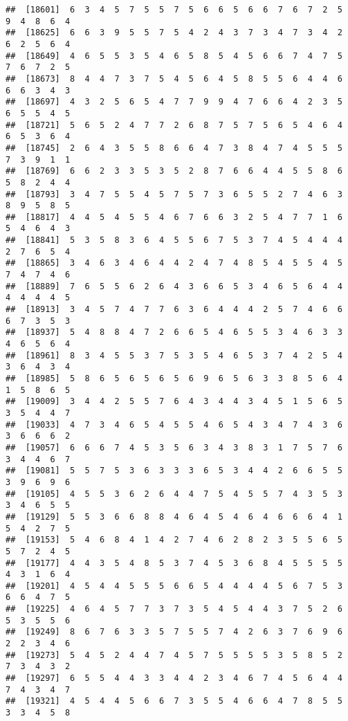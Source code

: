 \documentclass[
]{book}
\begin{document}
\begin{verbatim}
##  [18601]  6  3  4  5  7  5  5  7  5  6  6  5  6  6  7  6  7  2  5  9  4  8  6  4
##  [18625]  6  6  3  9  5  5  7  5  4  2  4  3  7  3  4  7  3  4  2  6  2  5  6  4
##  [18649]  4  6  5  5  3  5  4  6  5  8  5  4  5  6  6  7  4  7  5  7  6  7  2  5
##  [18673]  8  4  4  7  3  7  5  4  5  6  4  5  8  5  5  6  4  4  6  6  6  3  4  3
##  [18697]  4  3  2  5  6  5  4  7  7  9  9  4  7  6  6  4  2  3  5  6  5  5  4  5
##  [18721]  5  6  5  2  4  7  7  2  6  8  7  5  7  5  6  5  4  6  4  6  5  3  6  4
##  [18745]  2  6  4  3  5  5  8  6  6  4  7  3  8  4  7  4  5  5  5  7  3  9  1  1
##  [18769]  6  6  2  3  3  5  3  5  2  8  7  6  6  4  4  5  5  8  6  5  8  2  4  4
##  [18793]  3  4  7  5  5  4  5  7  5  7  3  6  5  5  2  7  4  6  3  8  9  5  8  5
##  [18817]  4  4  5  4  5  5  4  6  7  6  6  3  2  5  4  7  7  1  6  5  4  6  4  3
##  [18841]  5  3  5  8  3  6  4  5  5  6  7  5  3  7  4  5  4  4  4  2  7  6  5  4
##  [18865]  3  4  6  3  4  6  4  4  2  4  7  4  8  5  4  5  5  4  5  7  4  7  4  6
##  [18889]  7  6  5  5  6  2  6  4  3  6  6  5  3  4  6  5  6  4  4  4  4  4  4  5
##  [18913]  3  4  5  7  4  7  7  6  3  6  4  4  4  2  5  7  4  6  6  6  7  3  5  3
##  [18937]  5  4  8  8  4  7  2  6  6  5  4  6  5  5  3  4  6  3  3  4  6  5  6  4
##  [18961]  8  3  4  5  5  3  7  5  3  5  4  6  5  3  7  4  2  5  4  3  6  4  3  4
##  [18985]  5  8  6  5  6  5  6  5  6  9  6  5  6  3  3  8  5  6  4  1  5  8  6  5
##  [19009]  3  4  4  2  5  5  7  6  4  3  4  4  3  4  5  1  5  6  5  3  5  4  4  7
##  [19033]  4  7  3  4  6  5  4  5  5  4  6  5  4  3  4  7  4  3  6  3  6  6  6  2
##  [19057]  6  6  6  7  4  5  3  5  6  3  4  3  8  3  1  7  5  7  6  3  4  4  6  7
##  [19081]  5  5  7  5  3  6  3  3  3  6  5  3  4  4  2  6  6  5  5  3  9  6  9  6
##  [19105]  4  5  5  3  6  2  6  4  4  7  5  4  5  5  7  4  3  5  3  3  4  6  5  5
##  [19129]  5  5  3  6  6  8  8  4  6  4  5  4  6  4  6  6  6  4  1  5  4  2  7  5
##  [19153]  5  4  6  8  4  1  4  2  7  4  6  2  8  2  3  5  5  6  5  5  7  2  4  5
##  [19177]  4  4  3  5  4  8  5  3  7  4  5  3  6  8  4  5  5  5  5  4  3  1  6  4
##  [19201]  4  5  4  4  5  5  5  6  6  5  4  4  4  4  5  6  7  5  3  6  6  4  7  5
##  [19225]  4  6  4  5  7  7  3  7  3  5  4  5  4  4  3  7  5  2  6  5  3  5  5  6
##  [19249]  8  6  7  6  3  3  5  7  5  5  7  4  2  6  3  7  6  9  6  2  2  3  4  6
##  [19273]  5  4  5  2  4  4  7  4  5  7  5  5  5  5  3  5  8  5  2  7  3  4  3  2
##  [19297]  6  5  5  4  4  3  3  4  4  2  3  4  6  7  4  5  6  4  4  7  4  3  4  7
##  [19321]  4  5  4  4  5  6  6  7  3  5  5  4  6  6  4  7  8  5  5  3  3  4  5  8

\end{verbatim}
\end{document}
